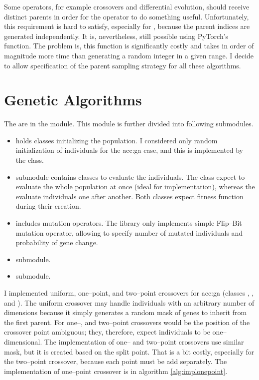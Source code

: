 Some operators, for example crossovers and differential evolution, should receive distinct parents in order for the operator to do something useful. Unfortunately, this requirement is hard to satisfy, especially for \gpuns, because the parent indices are generated independently. It is, nevertheless, still possible using PyTorch's  function. The problem is, this function is significantly costly and takes in order of magnitude more time than generating a random integer in a given range. I decide to allow specification of the parent sampling strategy for all these algorithms.



\section{Genetic Algorithms}
\label{chap:gaimpl}

The  are in the  module. This module is further divided into following submodules.
\begin{itemize}
    \item {} holds classes initializing the population. I considered only random initialization of individuals for the \acrshort{acc:ga} case, and this is implemented by the  class.
    \item {} submodule contains classes to evaluate the individuals. The  class expect to evaluate the whole population at once (ideal for \gpu implementation), whereas the  evaluate individuals one after another. Both classes expect fitness function during their creation.
    \item {} includes mutation operators. The library only implements simple Flip--Bit mutation operator, allowing to specify number of mutated individuals and probability of gene change.
    \item {} submodule.
    \item {} submodule.
\end{itemize}

I implemented uniform, one--point, and two--point crossovers for \acrshort{acc:ga} (classes , , and ). The uniform crossover may handle individuals with an arbitrary number of dimensions because it simply generates a random mask of genes to inherit from the first parent. For one--, and two--point crossovers would be the position of the crossover point ambiguous; they, therefore, expect individuals to be one--dimensional. The implementation of one-- and two--point crossovers use similar mask, but it is created based on the split point. That is a bit costly, especially for the two--point crossover, because each point must be add separately. The implementation of one--point crossover is in algorithm \ref{alg:implonepoint}.

